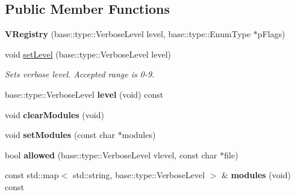 \subsection*{Public Member Functions}
\begin{DoxyCompactItemize}
\item 
{\bfseries V\+Registry} (base\+::type\+::\+Verbose\+Level level, base\+::type\+::\+Enum\+Type $\ast$p\+Flags)\hypertarget{classel_1_1base_1_1VRegistry_ac4b36d32d3722238024480ce66c52ad0}{}\label{classel_1_1base_1_1VRegistry_ac4b36d32d3722238024480ce66c52ad0}

\item 
void \hyperlink{classel_1_1base_1_1VRegistry_aea4fb84a03363080ee2501193084f71f}{set\+Level} (base\+::type\+::\+Verbose\+Level level)\hypertarget{classel_1_1base_1_1VRegistry_aea4fb84a03363080ee2501193084f71f}{}\label{classel_1_1base_1_1VRegistry_aea4fb84a03363080ee2501193084f71f}

\begin{DoxyCompactList}\small\item\em Sets verbose level. Accepted range is 0-\/9. \end{DoxyCompactList}\item 
base\+::type\+::\+Verbose\+Level {\bfseries level} (void) const \hypertarget{classel_1_1base_1_1VRegistry_ad68e225738ecde9a5a59e9fcdfdcc1b9}{}\label{classel_1_1base_1_1VRegistry_ad68e225738ecde9a5a59e9fcdfdcc1b9}

\item 
void {\bfseries clear\+Modules} (void)\hypertarget{classel_1_1base_1_1VRegistry_a52de90db82e57827ac3d3994f70c17cf}{}\label{classel_1_1base_1_1VRegistry_a52de90db82e57827ac3d3994f70c17cf}

\item 
void {\bfseries set\+Modules} (const char $\ast$modules)\hypertarget{classel_1_1base_1_1VRegistry_a65e202cc547cd11231d3ea0fb70765d0}{}\label{classel_1_1base_1_1VRegistry_a65e202cc547cd11231d3ea0fb70765d0}

\item 
bool {\bfseries allowed} (base\+::type\+::\+Verbose\+Level vlevel, const char $\ast$file)\hypertarget{classel_1_1base_1_1VRegistry_a13b725e3da8935fce5cf3c16fd3a2ff9}{}\label{classel_1_1base_1_1VRegistry_a13b725e3da8935fce5cf3c16fd3a2ff9}

\item 
const std\+::map$<$ std\+::string, base\+::type\+::\+Verbose\+Level $>$ \& {\bfseries modules} (void) const \hypertarget{classel_1_1base_1_1VRegistry_abc23bea6b9f2884caa6d5aadc8769892}{}\label{classel_1_1base_1_1VRegistry_abc23bea6b9f2884caa6d5aadc8769892}


\end{DoxyCompactItemize}
